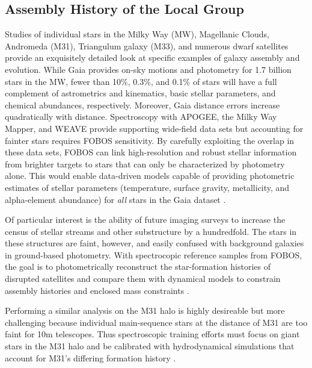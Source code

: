 
\subsection{Assembly History of the Local Group}
\label{sec:localgroup}

Studies of individual stars in the Milky Way (MW), Magellanic Clouds, Andromeda (M31), Triangulum galaxy (M33), and
numerous dwarf satellites provide an exquisitely detailed look at specific examples of galaxy assembly and evolution.
While Gaia provides on-sky motions and photometry for 1.7 billion stars in the MW, fewer than 10\%, 0.3\%, and 0.1\% of
stars will have a full complement of astrometrics and kinematics, basic stellar parameters, and chemical abundances,
respectively.  Moreover, Gaia distance errors increase quadratically with distance.  Spectroscopy with APOGEE, the
Milky Way Mapper, and WEAVE provide supporting wide-field data sets but accounting for fainter stars requires FOBOS
sensitivity.  By carefully exploiting the overlap in these data sets, FOBOS can link high-resolution and robust stellar
information from brighter targets to stars that can only be characterized by photometry alone.  This would enable
data-driven models capable of providing photometric estimates of stellar parameters (temperature, surface gravity,
metallicity, and alpha-element abundance) for {\it all} stars in the Gaia dataset  \citep[see][]{2015ApJ...808...16N,
2018arXiv180401530T, 2018arXiv180803278T}.

Of particular interest is the ability of future imaging surveys to increase the census of stellar streams and other
substructure by a hundredfold.  The stars in these structures are faint, however, and easily confused with background
galaxies in ground-based photometry.  With spectrocopic reference samples from FOBOS, the goal is to photometrically
reconstruct the star-formation histories of disrupted satellites and compare them with dynamical models to constrain
assembly histories and enclosed mass constraints \citep[e.g.,][]{2017ApJ...836..234S}.


Performing a similar analysis on the M31 halo is highly desireable but more challenging because individual
main-sequence stars at the distance of M31 are too faint for 10m telescopes.  Thus spectroscopic training efforts must
focus on giant stars in the M31 halo and be calibrated with hydrodynamical simulations that account for M31's differing
formation history  \citep[e.g.][]{2005MNRAS.356.1071R}.



